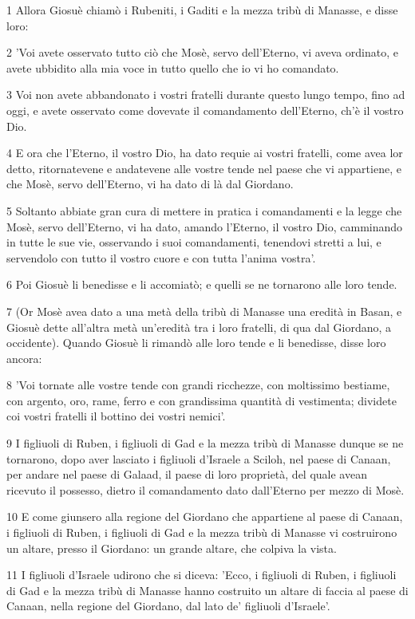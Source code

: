 \par 1 Allora Giosuè chiamò i Rubeniti, i Gaditi e la mezza tribù di Manasse, e disse loro:
\par 2 'Voi avete osservato tutto ciò che Mosè, servo dell'Eterno, vi aveva ordinato, e avete ubbidito alla mia voce in tutto quello che io vi ho comandato.
\par 3 Voi non avete abbandonato i vostri fratelli durante questo lungo tempo, fino ad oggi, e avete osservato come dovevate il comandamento dell'Eterno, ch'è il vostro Dio.
\par 4 E ora che l'Eterno, il vostro Dio, ha dato requie ai vostri fratelli, come avea lor detto, ritornatevene e andatevene alle vostre tende nel paese che vi appartiene, e che Mosè, servo dell'Eterno, vi ha dato di là dal Giordano.
\par 5 Soltanto abbiate gran cura di mettere in pratica i comandamenti e la legge che Mosè, servo dell'Eterno, vi ha dato, amando l'Eterno, il vostro Dio, camminando in tutte le sue vie, osservando i suoi comandamenti, tenendovi stretti a lui, e servendolo con tutto il vostro cuore e con tutta l'anima vostra'.
\par 6 Poi Giosuè li benedisse e li accomiatò; e quelli se ne tornarono alle loro tende.
\par 7 (Or Mosè avea dato a una metà della tribù di Manasse una eredità in Basan, e Giosuè dette all'altra metà un'eredità tra i loro fratelli, di qua dal Giordano, a occidente). Quando Giosuè li rimandò alle loro tende e li benedisse, disse loro ancora:
\par 8 'Voi tornate alle vostre tende con grandi ricchezze, con moltissimo bestiame, con argento, oro, rame, ferro e con grandissima quantità di vestimenta; dividete coi vostri fratelli il bottino dei vostri nemici'.
\par 9 I figliuoli di Ruben, i figliuoli di Gad e la mezza tribù di Manasse dunque se ne tornarono, dopo aver lasciato i figliuoli d'Israele a Sciloh, nel paese di Canaan, per andare nel paese di Galaad, il paese di loro proprietà, del quale avean ricevuto il possesso, dietro il comandamento dato dall'Eterno per mezzo di Mosè.
\par 10 E come giunsero alla regione del Giordano che appartiene al paese di Canaan, i figliuoli di Ruben, i figliuoli di Gad e la mezza tribù di Manasse vi costruirono un altare, presso il Giordano: un grande altare, che colpiva la vista.
\par 11 I figliuoli d'Israele udirono che si diceva: 'Ecco, i figliuoli di Ruben, i figliuoli di Gad e la mezza tribù di Manasse hanno costruito un altare di faccia al paese di Canaan, nella regione del Giordano, dal lato de' figliuoli d'Israele'.
